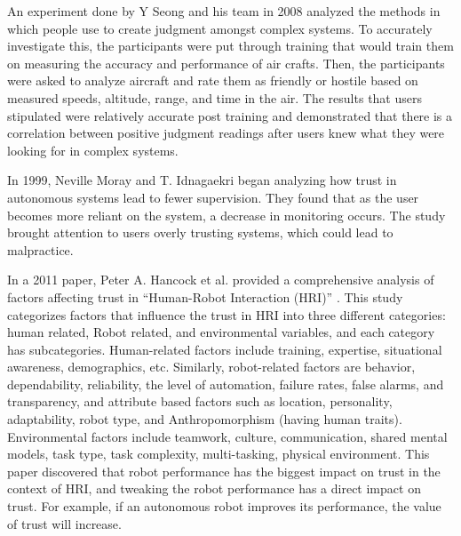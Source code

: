 \documentclass[runningheads,a4paper]{llncs}
\begin{document}
An experiment done by Y Seong and his team in 2008 analyzed the methods in which people use to create judgment amongst complex systems\cite{seong2008impact}. To accurately investigate this, the participants were put through training that would train them on measuring the accuracy and performance of air crafts.  Then, the participants were asked to analyze aircraft and rate them as friendly or hostile based on measured speeds, altitude, range, and time in the air. The results that users stipulated were relatively accurate post training and demonstrated that there is a correlation between positive judgment readings after users knew what they were looking for in complex systems.

In 1999, Neville Moray and T. Idnagaekri began analyzing how trust in autonomous systems lead to fewer supervision\cite{moray1999laboratory}.  They found that as the user becomes more reliant on the system, a decrease in monitoring occurs. The study brought attention to users overly trusting systems, which could lead to malpractice. 

In a 2011 paper, Peter A. Hancock et al. provided a comprehensive analysis of factors affecting trust in ``Human-Robot Interaction (HRI)'' \cite{hancock2011meta}. This study categorizes factors that influence the trust in HRI into three different categories: human related, Robot related, and environmental variables, and each category has subcategories. Human-related factors include training, expertise, situational awareness, demographics, etc. Similarly, robot-related factors are behavior, dependability, reliability, the level of automation, failure rates, false alarms, and transparency, and attribute based factors such as location, personality, adaptability, robot type, and Anthropomorphism (having human traits). Environmental factors include teamwork, culture, communication, shared mental models, task type, task complexity, multi-tasking, physical environment. This paper discovered that robot performance has the biggest impact on trust in the context of HRI, and tweaking the robot performance has a direct impact on trust. For example, if an autonomous robot improves its performance, the value of trust will increase.
\end{document}
